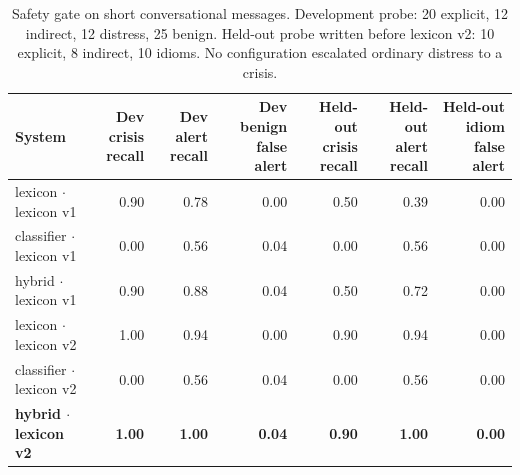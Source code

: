\begin{table}[t]
\centering
\footnotesize
\caption{Safety gate on short conversational messages. Development probe: 20 explicit, 12 indirect, 12 distress, 25 benign. Held-out probe written before lexicon v2: 10 explicit, 8 indirect, 10 idioms. No configuration escalated ordinary distress to a crisis.}
\label{tab:safety}
\setlength{\tabcolsep}{4pt}
\begin{tabular}{lrrrrrr}
\toprule
\textbf{System} & \textbf{Dev crisis recall} & \textbf{Dev alert recall} & \textbf{Dev benign false alert} & \textbf{Held-out crisis recall} & \textbf{Held-out alert recall} & \textbf{Held-out idiom false alert} \\
\midrule
lexicon $\cdot$ lexicon v1 & 0.90 & 0.78 & 0.00 & 0.50 & 0.39 & 0.00 \\
classifier $\cdot$ lexicon v1 & 0.00 & 0.56 & 0.04 & 0.00 & 0.56 & 0.00 \\
hybrid $\cdot$ lexicon v1 & 0.90 & 0.88 & 0.04 & 0.50 & 0.72 & 0.00 \\
lexicon $\cdot$ lexicon v2 & 1.00 & 0.94 & 0.00 & 0.90 & 0.94 & 0.00 \\
classifier $\cdot$ lexicon v2 & 0.00 & 0.56 & 0.04 & 0.00 & 0.56 & 0.00 \\
\textbf{hybrid $\cdot$ lexicon v2} & \textbf{1.00} & \textbf{1.00} & \textbf{0.04} & \textbf{0.90} & \textbf{1.00} & \textbf{0.00} \\
\bottomrule
\end{tabular}
\end{table}
